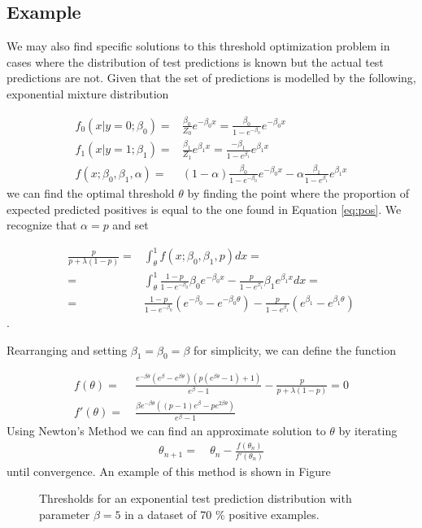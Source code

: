 \documentclass{article}
\begin{document}

\subsection{Example}

We may also find specific solutions to this threshold optimization problem in cases where the distribution of test predictions is known but the actual test predictions are not.
Given that the set of predictions is modelled by the following, exponential mixture distribution

\begin{align*}
    f_0(x\vert y=0;\beta_0) =& \frac{\beta_0}{Z_0}e^{-\beta_0 x} = \frac{\beta_0}{1-e^{-\beta_0}}e^{-\beta_0 x} \\
    f_1(x\vert y=1;\beta_1) =& \frac{\beta_1}{Z_1}e^{\beta_1 x} = \frac{-\beta_1}{1-e^{\beta_1}}e^{\beta_1 x}\\
    f (x;\beta_0,\beta_1,\alpha) =& (1-\alpha)\frac{\beta_0}{1-e^{-\beta_0}}e^{-\beta_0 x} - \alpha\frac{\beta_1}{1-e^{\beta_1}}e^{\beta_1 x} %
\end{align*}
we can find the optimal threshold $\theta$ by finding the point where the proportion of expected predicted positives is equal to the one found in Equation \ref{eq:pos}. We recognize that $\alpha = p$ and set

\begin{align}
    \frac{p}{p+\lambda(1-p)} = & \int_{\theta}^1 f(x;\beta_0, \beta_1, p) dx = \\
    = & \int_{\theta}^1 \frac{1-p}{1-e^{-\beta_0}}\beta_0e^{-\beta_0x} - \frac{p}{1-e^{\beta_1}}\beta_1e^{\beta_1x} dx = \\
    = & \frac{1-p}{1-e^{-\beta_0}}(e^{-\beta_0}-e^{-\beta_0 \theta}) - \frac{p}{1-e^{\beta_1}}(e^{\beta_1}-e^{\beta_1 \theta})
\end{align}.

Rearranging and setting $\beta_1 = \beta_0 = \beta$ for simplicity, we can define the function

\begin{align}
    f(\theta) =& \ \frac{e^{-\beta \theta} (e^\beta-e^{\beta \theta}) (p(e^{\beta \theta}-1) + 1)}{e^{\beta}-1} - \frac{p}{p+\lambda(1-p)} = 0 \\
    f'(\theta) =& \ \frac{\beta e^{-\beta \theta} ((p-1) e^\beta - p e^{2\beta \theta})}{e^{\beta}-1}
\end{align}
Using Newton's Method we can find an approximate solution to $\theta$ by iterating
\begin{align}
    \theta_{n+1} =& \ \theta_n - \frac{f(\theta_n)}{f'(\theta_n)}
\end{align}
until convergence. An example of this method is shown in Figure
\begin{figure}
    \centering
    \scalebox{.8}{}
    \caption{Thresholds for an exponential test prediction distribution with parameter $\beta = 5$ in a dataset of 70 \% positive examples.}
\end{figure}
\end{document}
